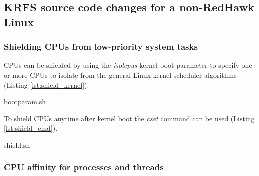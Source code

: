 \documentclass[12pt]{article}
\begin{document}
\subsection{KRFS source code changes for a non-RedHawk Linux}

\subsubsection{Shielding CPUs from low-priority system tasks}

CPUs can be shielded by using the \emph{isolcpus} kernel boot parameter to
specify one or more CPUs to isolate from the general Linux kernel scheduler
algorithms (Listing \ref{lst:shield_kernel}).


\vspace{0.8cm}
\lstset{
    language=bash,
    basicstyle=\footnotesize\ttfamily,
    linewidth=6in,
    frame=single,
    showstringspaces=false,
    keywordstyle=\ttfamily
}
\begin{minipage}{\linewidth}
\begin{adjustwidth}{0.0in}{0.0in}
\begin{lstinputlisting}[caption={Shielding CPUs at at kernel boot command-line},
label={lst:shield_kernel}]{bootparam.sh}

\end{lstinputlisting}
\end{adjustwidth}
\end{minipage}
\vspace{0.8cm}

To shield CPUs anytime after kernel boot the \emph{cset} command can be used
(Listing \ref{lst:shield_cmd}).

\vspace{0.8cm}
\lstset{
    language=bash,
    basicstyle=\footnotesize\ttfamily,
    linewidth=6in,
    showstringspaces=false,
    keywordstyle=\ttfamily
}
\begin{adjustwidth}{0.0in}{0.0in}
\begin{lstinputlisting}[caption={Shielding CPUs at command-line},
label={lst:shield_cmd}]{shield.sh}

\end{lstinputlisting}
\end{adjustwidth}
\vspace{0.8cm}

\subsubsection{CPU affinity for processes and threads}
\end{document}
